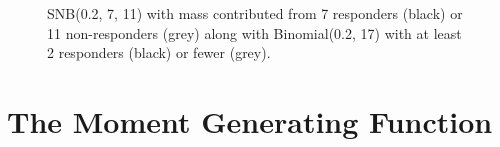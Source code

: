 \documentclass[review]{elsarticle}
\begin{document}
\begin{figure}[t!]
\centering
{}
\hfill
{}
\caption{
SNB(0.2, 7, 11) with mass contributed from 
7 responders (black) or 11 non-responders (grey) along with 
Binomial(0.2, 17) with at least 2 responders (black) or fewer (grey).
}
\label{fig:snb_bin_compare}
\end{figure}

\section{The Moment Generating Function}
\end{document}
